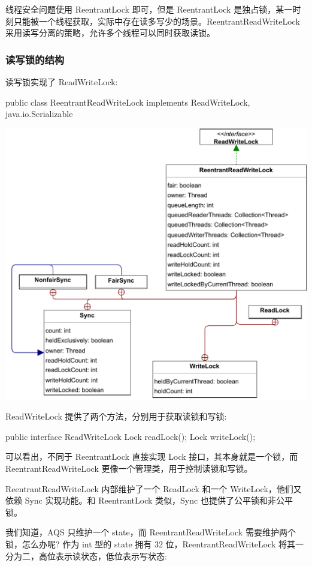 线程安全问题使用 ReentrantLock 即可，但是 ReentrantLock 是独占锁，某一时刻只能被一个线程获取，实际中存在读多写少的场景。ReentrantReadWriteLock 采用读写分离的策略，允许多个线程可以同时获取读锁。

\subsubsection*{读写锁的结构}

读写锁实现了 ReadWriteLock:

\begin{Java}
public class ReentrantReadWriteLock implements ReadWriteLock, java.io.Serializable
\end{Java}

\begin{center}
    \includegraphics[width=0.7\linewidth]{../../../Images/ReentrantReadWriteLock.pdf}
\end{center}

ReadWriteLock 提供了两个方法，分别用于获取读锁和写锁:

\begin{Java}
public interface ReadWriteLock {
    Lock readLock();
    Lock writeLock();
}
\end{Java}

可以看出，不同于 ReentrantLock 直接实现 Lock 接口，其本身就是一个锁，而 ReentrantReadWriteLock 更像一个管理类，用于控制读锁和写锁。

ReentrantReadWriteLock 内部维护了一个 ReadLock 和一个 WriteLock，他们又依赖 Sync 实现功能。和 ReentrantLock 类似，Sync 也提供了公平锁和非公平锁。

我们知道，AQS 只维护一个 state，而 ReentrantReadWriteLock 需要维护两个锁，怎么办呢? 作为 int 型的 state 拥有 32 位，ReentrantReadWriteLock 将其一分为二，高位表示读状态，低位表示写状态:

